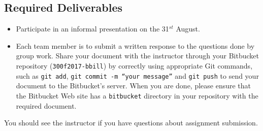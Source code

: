
\vspace*{-.2in}
\subsection*{Required Deliverables}
\vspace*{-.1in}
\begin{itemize}
	\item Participate in an informal presentation on the 31$^{st}$ August.
	\item Each team member is to submit a written response to the questions done by group work. Share your document with the instructor through your Bitbucket repository ({\tt 300f2017-bbill}) by correctly using  appropriate Git commands, such as {\tt git add}, {\tt git commit -m ``your message''} and {\tt git push} to send your document to the Bitbucket's server. When you are done, please ensure that the Bitbucket Web site has
a {\tt bitbucket} directory in your repository with the required document.  
\end{itemize}

\noindent You should see 
the instructor if you have questions about assignment submission.

